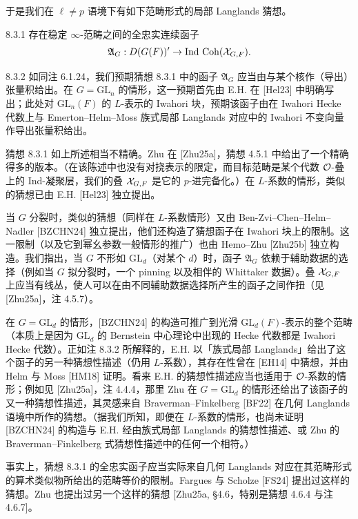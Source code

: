 于是我们在 $\ell\neq p$ 语境下有如下范畴形式的局部 Langlands 猜想。

\begin{conj}{8.3.1}\label{conj:a4-8-3-1}
存在稳定 $\infty$-范畴之间的全忠实连续函子
\[
\mathfrak A_G:D(G(F))'\to\operatorname{Ind}\,\operatorname{Coh}(\mathcal{X}_{G,F}).
\]
\end{conj}

\begin{rem}{8.3.2}\label{rem:a4-8-3-2}
如同注 6.1.24，我们预期猜想 8.3.1 中的函子 $\mathfrak A_G$ 应当由与某个核作（导出）张量积给出。在 $G=\mathrm{GL}_n$ 的情形，这一预期首先由 E.H. 在 [Hel23] 中明确写出；此处对 $\mathrm{GL}_n(F)$ 的 $L$-表示的 Iwahori 块，预期该函子由在 Iwahori Hecke 代数上与 Emerton--Helm--Moss 族式局部 Langlands 对应中的 Iwahori 不变向量作导出张量积给出。

猜想 8.3.1 如上所述相当不精确。Zhu 在 [Zhu25a]，猜想 4.5.1 中给出了一个精确得多的版本。（在该陈述中也没有对挠表示的限定，而目标范畴是某个代数 $\mathcal{O}$-叠上的 Ind-凝聚层，我们的叠 $\mathcal{X}_{G,F}$ 是它的 $p$-进完备化。）在 $L$-系数的情形，类似的猜想已由 E.H. [Hel23] 独立提出。

当 $G$ 分裂时，类似的猜想（同样在 $L$-系数情形）又由 Ben-Zvi--Chen--Helm--Nadler [BZCHN24] 独立提出，他们还构造了猜想函子在 Iwahori 块上的限制。这一限制（以及它到幂幺参数一般情形的推广）也由 Hemo--Zhu [Zhu25b] 独立构造。我们指出，当 $G$ 不形如 $\mathrm{GL}_d$（对某个 $d$）时，函子 $\mathfrak A_G$ 依赖于辅助数据的选择（例如当 $G$ 拟分裂时，一个 pinning 以及相伴的 Whittaker 数据）。叠 $\mathcal{X}_{G,F}$ 上应当有线丛，使人可以在由不同辅助数据选择所产生的函子之间作扭（见 [Zhu25a]，注 4.5.7）。

在 $G=\mathrm{GL}_d$ 的情形，[BZCHN24] 的构造可推广到光滑 $\mathrm{GL}_d(F)$-表示的整个范畴（本质上是因为 $\mathrm{GL}_d$ 的 Bernstein 中心理论中出现的 Hecke 代数都是 Iwahori Hecke 代数）。正如注 8.3.2 所解释的，E.H. 以「族式局部 Langlands」给出了这个函子的另一种猜想性描述（仍用 $L$-系数），其存在性曾在 [EH14] 中猜想，并由 Helm 与 Moss [HM18] 证明。看来 E.H. 的猜想性描述应当也适用于 $\mathcal{O}$-系数的情形；例如见 [Zhu25a]，注 4.4.4，那里 Zhu 在 $G=\mathrm{GL}_d$ 的情形还给出了该函子的又一种猜想性描述，其灵感来自 Braverman--Finkelberg [BF22] 在几何 Langlands 语境中所作的猜想。（据我们所知，即便在 $L$-系数的情形，也尚未证明 [BZCHN24] 的构造与 E.H. 经由族式局部 Langlands 的猜想性描述、或 Zhu 的 Braverman--Finkelberg 式猜想性描述中的任何一个相符。）

事实上，猜想 8.3.1 的全忠实函子应当实际来自几何 Langlands 对应在其范畴形式的算术类似物所给出的范畴等价的限制。Fargues 与 Scholze [FS24] 提出过这样的猜想。Zhu 也提出过另一个这样的猜想 [Zhu25a, §4.6，特别是猜想 4.6.4 与注 4.6.7]。
\end{rem}

